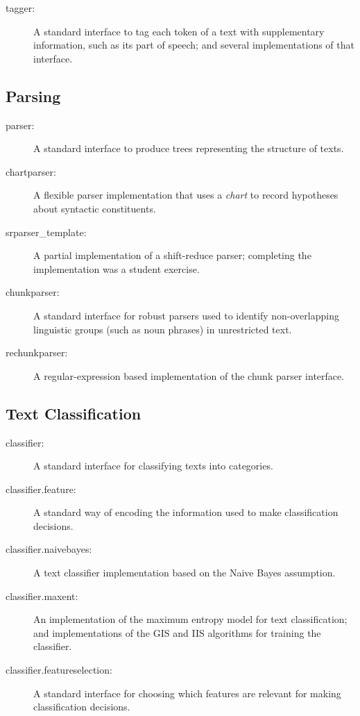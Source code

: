 \documentclass[11pt]{article}
\begin{document}
\begin{description}
\item[tagger:] A standard interface to tag each token of
      a text with supplementary information, such as its part of
      speech; and several implementations of that interface.
\end{description}

\subsection*{Parsing}

\begin{description}
\item[parser:] A standard interface to produce trees
      representing the structure of texts.
\item[chartparser:] A flexible parser implementation
      that uses a \emph{chart} to record hypotheses about
      syntactic constituents.
\item[srparser\_template:] A partial implementation of a
      shift-reduce parser; completing the implementation was a
      student exercise.
\item[chunkparser:] A standard interface for robust
      parsers used to identify non-overlapping linguistic groups
      (such as noun phrases) in unrestricted text.
\item[rechunkparser:] A regular-expression based
      implementation of the chunk parser interface.
\end{description}

\subsection*{Text Classification}

\begin{description}
\item[classifier:] A standard interface for classifying
      texts into categories.
\item[classifier.feature:] A standard way of encoding
      the information used to make classification decisions.
\item[classifier.naivebayes:] A text classifier
      implementation based on the Naive Bayes assumption.
\item[classifier.maxent:] An implementation of the
      maximum entropy model for text classification; and
      implementations of the GIS and IIS algorithms for training
      the classifier.
\item[classifier.featureselection:] A standard interface
      for choosing which features are relevant for making
      classification decisions.
\end{description}
\end{document}
